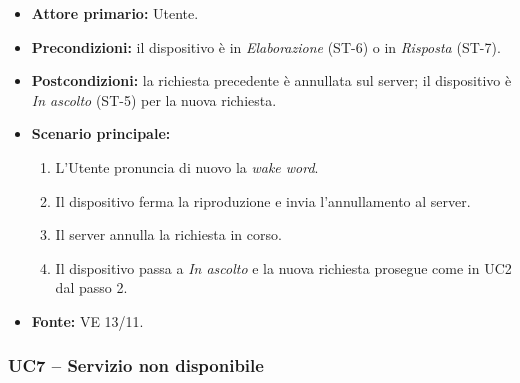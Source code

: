 \documentclass[12pt,a4paper]{article}
\newcommand{\tightlist}{\setlength{\itemsep}{1pt}\setlength{\parskip}{0pt}}
\begin{document}
\begin{itemize}

\tightlist

\item \textbf{Attore primario:} Utente.

\item \textbf{Precondizioni:} il dispositivo è in \emph{Elaborazione} (ST-6) o in \emph{Risposta} (ST-7).

\item \textbf{Postcondizioni:} la richiesta precedente è annullata sul server; il dispositivo è \emph{In ascolto} (ST-5) per la nuova richiesta.

\item \textbf{Scenario principale:}

\begin{enumerate}

\tightlist

\item L'Utente pronuncia di nuovo la \emph{wake word}.

\item Il dispositivo ferma la riproduzione e invia l'annullamento al server.

\item Il server annulla la richiesta in corso.

\item Il dispositivo passa a \emph{In ascolto} e la nuova richiesta prosegue come in UC2 dal passo 2.

\end{enumerate}

\item \textbf{Fonte:} VE 13/11.

\end{itemize}



\subsubsection{UC7 -- Servizio non disponibile}
\end{document}
